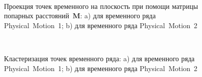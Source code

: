 \documentclass[12pt, twoside]{article}
\numberwithin{equation}{section}
\begin{document}
\begin{figure}[h!t]\center
{}
\\
\caption{Проекция точек временного на плоскость при помощи матрицы попарных расстояний~$\textbf{M}$: a) для временного ряда Physical~Motion~1; b) для временного ряда Physical~Motion~2}
\label{fig_real_2D}
\end{figure}

\begin{figure}[h!t]\center
{}
\\
\caption{Кластеризация точек временного ряда: 
a) для временного ряда Physical~Motion~1; b) для временного ряда Physical~Motion~2}
\label{fig_real_claster}
\end{figure}
\end{document}
